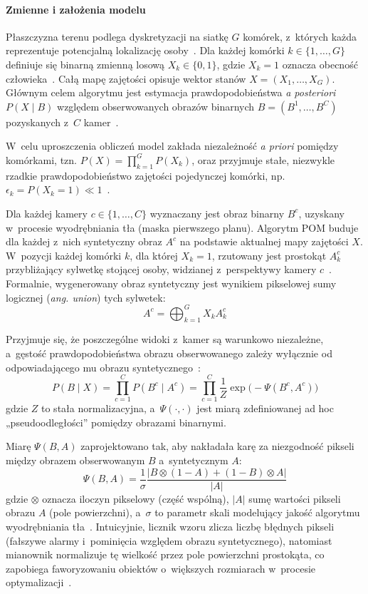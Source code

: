 \paragraph{Zmienne i założenia modelu}

Płaszczyzna terenu podlega dyskretyzacji na siatkę $G$ komórek, z~których każda reprezentuje
potencjalną lokalizację osoby~\cite{fleuret2008}. Dla każdej komórki $k \in \{1,\dots,G\}$
definiuje się binarną zmienną losową $X_k \in \{0,1\}$, gdzie $X_k = 1$ oznacza obecność
człowieka~\cite{fleuret2008}. Całą mapę zajętości opisuje wektor stanów $X = (X_1,\dots,X_G)$.
Głównym celem algorytmu jest estymacja prawdopodobieństwa \textit{a posteriori} $P(X \mid B)$
względem obserwowanych obrazów binarnych $B = (B^1,\dots,B^C)$ pozyskanych z~$C$
kamer~\cite{fleuret2008, mandeljc2013tracking}.

W~celu uproszczenia obliczeń model zakłada niezależność \textit{a priori} pomiędzy komórkami, tzn.
$P(X) = \prod_{k=1}^{G} P(X_k)$, oraz przyjmuje stałe, niezwykle rzadkie prawdopodobieństwo
zajętości pojedynczej komórki, np. $\epsilon_k = P(X_k = 1) \ll 1$~\cite{fleuret2008}.

Dla każdej kamery $c \in \{1,\dots,C\}$ wyznaczany jest obraz binarny $B^c$, uzyskany w~procesie
wyodrębniania tła (maska pierwszego planu). Algorytm POM buduje dla każdej z~nich syntetyczny obraz
$A^c$ na podstawie aktualnej mapy zajętości $X$. W~pozycji każdej komórki $k$, dla której $X_k=1$,
rzutowany jest prostokąt $A^c_k$ przybliżający sylwetkę stojącej osoby, widzianej z~perspektywy
kamery $c$~\cite{fleuret2008}. Formalnie, wygenerowany obraz syntetyczny jest wynikiem pikselowej
sumy logicznej (\textit{ang. union}) tych sylwetek:
\[
  A^c = \bigoplus_{k=1}^{G} X_k A^c_k
\]

Przyjmuje się, że poszczególne widoki z~kamer są warunkowo niezależne, a~gęstość prawdopodobieństwa
obrazu obserwowanego zależy wyłącznie od odpowiadającego mu obrazu
syntetycznego~\cite{fleuret2008}:
\[
  P(B \mid X) = \prod_{c=1}^{C} P(B^c \mid A^c) = \prod_{c=1}^{C} \frac{1}{Z} \exp\!\big(-\Psi(B^c, A^c)\big)
\]
gdzie $Z$ to stała normalizacyjna, a~$\Psi(\cdot,\cdot)$ jest miarą zdefiniowanej ad hoc
„pseudoodległości” pomiędzy obrazami binarnymi.

Miarę $\Psi(B,A)$ zaprojektowano tak, aby nakładała karę za niezgodność pikseli między obrazem
obserwowanym $B$ a~syntetycznym $A$:
\[
  \Psi(B,A) = \frac{1}{\sigma} \frac{\big|B \otimes (1 - A) + (1 - B) \otimes A\big|}{|A|}
\]
gdzie $\otimes$ oznacza iloczyn pikselowy (część wspólną), $|A|$ sumę wartości pikseli obrazu $A$
(pole powierzchni), a~$\sigma$ to parametr skali modelujący jakość algorytmu wyodrębniania
tła~\cite{fleuret2008}. Intuicyjnie, licznik wzoru zlicza liczbę błędnych pikseli (fałszywe alarmy
i~pominięcia względem obrazu syntetycznego), natomiast mianownik normalizuje tę wielkość przez pole
powierzchni prostokąta, co zapobiega faworyzowaniu obiektów o~większych rozmiarach w~procesie
optymalizacji~\cite{fleuret2008}.

